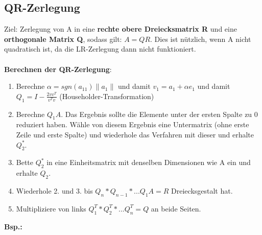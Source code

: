 \documentclass[10pt,a4paper]{article}
\newcommand{\norm}[1]{\lVert#1\rVert}
\begin{document}
	\subsection{QR-Zerlegung}
	Ziel: Zerlegung von A in eine \textbf{rechte obere Dreiecksmatrix R} und eine \textbf{orthogonale Matrix Q}, sodass gilt: $A = QR$. Dies ist nützlich, wenn A nicht quadratisch ist, da die LR-Zerlegung dann nicht funktioniert.\\\\
	\textbf{Berechnen der QR-Zerlegung}:
	\begin{enumerate}
		\item Berechne $\alpha = sgn(a_{11})\norm{a_1}$ und damit $v_1 = a_1 + \alpha e_1$ und damit $Q_1 = I - \frac{2vv^T}{v^Tv}$ (Householder-Transformation)
		\item Berechne $Q_1A$. Das Ergebnis sollte die Elemente unter der ersten Spalte zu 0 reduziert haben. Wähle von diesem Ergebnis eine Untermatrix (ohne erste Zeile und erste Spalte) und wiederhole das Verfahren mit dieser und erhalte $Q_2^*$.
		\item Bette $Q_2^*$ in eine Einheitsmatrix mit denselben Dimensionen wie A ein und erhalte $Q_2$.
		\item Wiederhole 2. und 3. bis $Q_n * Q_{n - 1} * ... Q_1A = R$ Dreiecksgestalt hat.
		\item Multipliziere von links $Q_1^T * Q_2^T * ... Q_n^T = Q$ an beide Seiten.
	\end{enumerate}
	\newpage
	\textbf{Bsp.:}
\end{document}
